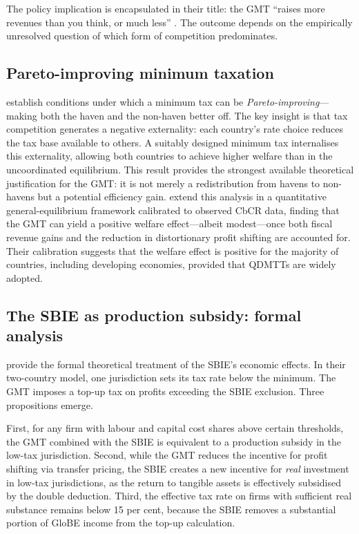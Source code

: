 \documentclass[12pt,a4paper]{article}
\begin{document}
The policy implication is encapsulated in their title: the GMT ``raises more revenues than you think, or much less'' \parencite{janeba2023}.
The outcome depends on the empirically unresolved question of which form of competition predominates.

\subsection{Pareto-improving minimum taxation}

\textcite{hebous2023} establish conditions under which a minimum tax can be \emph{Pareto-improving}---making both the haven and the non-haven better off.
The key insight is that tax competition generates a negative externality: each country's rate choice reduces the tax base available to others.
A suitably designed minimum tax internalises this externality, allowing both countries to achieve higher welfare than in the uncoordinated equilibrium.
This result provides the strongest available theoretical justification for the GMT: it is not merely a redistribution from havens to non-havens but a potential efficiency gain.
\textcite{brun2025} extend this analysis in a quantitative general-equilibrium framework calibrated to observed CbCR data, finding that the GMT can yield a positive welfare effect---albeit modest---once both fiscal revenue gains and the reduction in distortionary profit shifting are accounted for.
Their calibration suggests that the welfare effect is positive for the majority of countries, including developing economies, provided that QDMTTs are widely adopted.

\subsection{The SBIE as production subsidy: formal analysis}

\textcite{schjelderup2024} provide the formal theoretical treatment of the SBIE's economic effects.
In their two-country model, one jurisdiction sets its tax rate below the minimum.
The GMT imposes a top-up tax on profits exceeding the SBIE exclusion.
Three propositions emerge.

First, for any firm with labour and capital cost shares above certain thresholds, the GMT combined with the SBIE is equivalent to a production subsidy in the low-tax jurisdiction.
Second, while the GMT reduces the incentive for profit shifting via transfer pricing, the SBIE creates a new incentive for \emph{real} investment in low-tax jurisdictions, as the return to tangible assets is effectively subsidised by the double deduction.
Third, the effective tax rate on firms with sufficient real substance remains below 15 per cent, because the SBIE removes a substantial portion of GloBE income from the top-up calculation.
\end{document}

